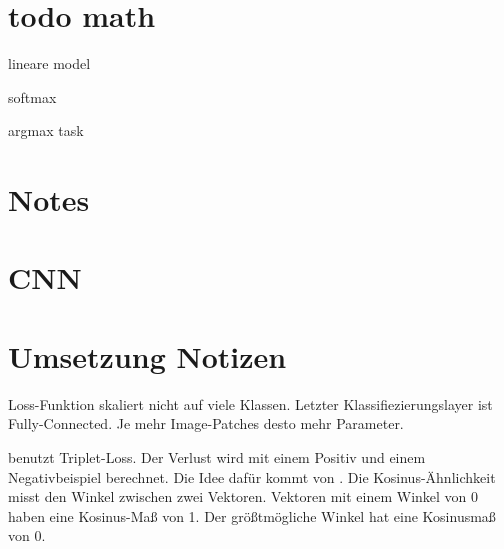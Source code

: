 \documentclass[nobib, nohyper, a4paper, notoc, sfsidenotes,  twoside]{tufte-book}
\begin{document}
\section{todo math}
lineare model
\cite[104]{GoodfellowDeeplearning2016}

softmax 

argmax task

\section{Notes}
\section{CNN}
\cite{GoodfellowDeeplearning2016}

\section{Umsetzung Notizen}

\cite{DosovitskiyDiscriminativeUnsupervisedFeature2016} Loss-Funktion skaliert nicht auf viele Klassen.
Letzter Klassifiezierungslayer ist Fully-Connected. Je mehr Image-Patches desto mehr Parameter.

\cite{DoerschMultitaskSelfSupervisedVisual2017} benutzt Triplet-Loss.
Der Verlust wird mit einem Positiv und einem Negativbeispiel berechnet.
Die Idee dafür kommt von \citeauthor{Wang_2015_ICCV}.
Die Kosinus-Ähnlichkeit misst den Winkel zwischen zwei Vektoren. Vektoren mit einem Winkel von 0 haben
eine Kosinus-Maß von 1. Der größtmögliche Winkel hat eine Kosinusmaß von 0.
\end{document}

